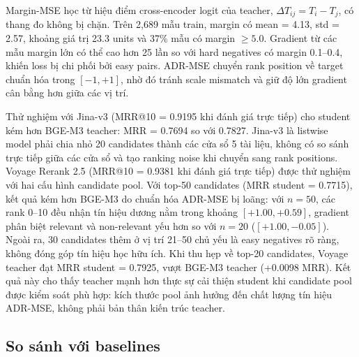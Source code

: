 \documentclass[../DoAn.tex]{subfiles}
\begin{document}
Margin-MSE học từ hiệu điểm cross-encoder logit của teacher, $\Delta T_{ij}=T_i-T_j$, có thang đo không bị chặn. Trên 2,689 mẫu train, margin có mean = 4.13, std = 2.57, khoảng giá trị 23.3 units và 37\% mẫu có margin $\geq 5.0$. Gradient từ các mẫu margin lớn có thể cao hơn 25 lần so với hard negatives có margin 0.1--0.4, khiến loss bị chi phối bởi easy pairs. ADR-MSE chuyển rank position về target chuẩn hóa trong $[-1,+1]$, nhờ đó tránh scale mismatch và giữ độ lớn gradient cân bằng hơn giữa các vị trí.

Thử nghiệm với Jina-v3 (MRR@10 = 0.9195 khi đánh giá trực tiếp) cho student kém hơn BGE-M3 teacher: MRR = 0.7694 so với 0.7827. Jina-v3 là listwise model phải chia nhỏ 20 candidates thành các cửa sổ 5 tài liệu, không có so sánh trực tiếp giữa các cửa sổ và tạo ranking noise khi chuyển sang rank positions. Voyage Rerank 2.5 (MRR@10 = 0.9381 khi đánh giá trực tiếp) được thử nghiệm với hai cấu hình candidate pool. Với top-50 candidates (MRR student = 0.7715), kết quả kém hơn BGE-M3 do chuẩn hóa ADR-MSE bị loãng: với $n=50$, các rank 0--10 đều nhận tín hiệu dương nằm trong khoảng $[+1.00, +0.59]$, gradient phân biệt relevant và non-relevant yếu hơn so với $n=20$ ($[+1.00, -0.05]$). Ngoài ra, 30 candidates thêm ở vị trí 21--50 chủ yếu là easy negatives rõ ràng, không đóng góp tín hiệu học hữu ích. Khi thu hẹp về top-20 candidates, Voyage teacher đạt MRR student = 0.7925, vượt BGE-M3 teacher (+0.0098 MRR). Kết quả này cho thấy teacher mạnh hơn thực sự cải thiện student khi candidate pool được kiểm soát phù hợp: kích thước pool ảnh hưởng đến chất lượng tín hiệu ADR-MSE, không phải bản thân kiến trúc teacher.

\subsection{So sánh với baselines}
\label{subsection:5.2.4}
\end{document}
